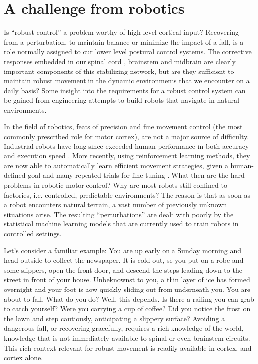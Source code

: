\section{A challenge from robotics}

Is ``robust control'' a problem worthy of high level cortical input? Recovering from a perturbation, to maintain balance or minimize the impact of a fall, is a role normally assigned to our lower level postural control systems. The corrective responses embedded in our spinal cord \cite{Sherrington1893b,Sherrington1910}, brainstem \cite{Arshian2014} and midbrain \cite{Grillner1973} are clearly important components of this stabilizing network, but are they sufficient to maintain robust movement in the dynamic environments that we encounter on a daily basis? Some insight into the requirements for a robust control system can be gained from engineering attempts to build robots that navigate in natural environments.

In the field of robotics, feats of precision and fine movement control (the most commonly prescribed role for motor cortex), are not a major source of difficulty. Industrial robots have long since exceeded human performance in both accuracy and execution speed \cite{Senoo2009}. More recently, using reinforcement learning methods, they are now able to automatically learn efficient movement strategies, given a human-defined goal and many repeated trials for fine-tuning \cite{Coates2008}. What then are the hard problems in robotic motor control? Why are most robots still confined to factories, i.e. controlled, predictable environments? The reason is that as soon as a robot encounters natural terrain, a vast number of previously unknown situations arise. The resulting ``perturbations'' are dealt with poorly by the statistical machine learning models that are currently used to train robots in controlled settings.

Let’s consider a familiar example: You are up early on a Sunday morning and head outside to collect the newspaper. It is cold out, so you put on a robe and some slippers, open the front door, and descend the steps leading down to the street in front of your house. Unbeknownst to you, a thin layer of ice has formed overnight and your foot is now quickly sliding out from underneath you. You are about to fall. What do you do? Well, this depends. Is there a railing you can grab to catch yourself? Were you carrying a cup of coffee? Did you notice the frost on the lawn and step cautiously, anticipating a slippery surface? Avoiding a dangerous fall, or recovering gracefully, requires a rich knowledge of the world, knowledge that is not immediately available to spinal or even brainstem circuits. This rich context relevant for robust movement is readily available in cortex, and cortex alone.

